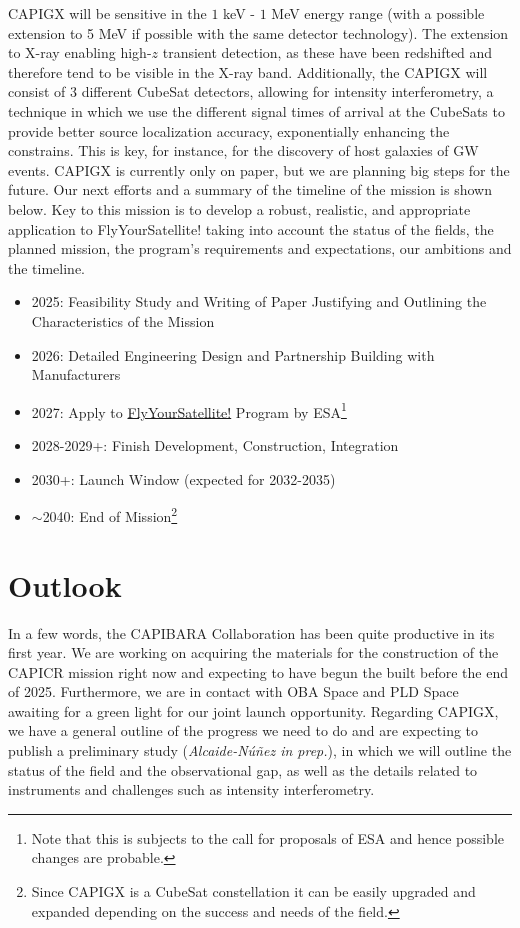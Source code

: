 \documentclass[arxiv,usenatbib]{iupartex}
\begin{document}
CAPIGX will be sensitive in the $1$ keV - $1$ MeV energy range (with a possible extension to 5 MeV if possible with the same detector technology). The extension to X-ray enabling high-$z$ transient detection, as these have been redshifted and therefore tend to be visible in the X-ray band. Additionally, the CAPIGX will consist of 3 different CubeSat detectors, allowing for intensity interferometry, a technique in which we use the different signal times of arrival at the CubeSats to provide better source localization accuracy, exponentially enhancing the constrains. This is key, for instance, for the discovery of host galaxies of GW events. CAPIGX is currently only on paper, but we are planning big steps for the future. Our next efforts and a summary of the timeline of the mission is shown below. Key to this mission is to develop a robust, realistic, and appropriate application to FlyYourSatellite! taking into account the status of the fields, the planned mission, the program's requirements and expectations, our ambitions and the timeline.
\begin{itemize}
    \item 2025: Feasibility Study and Writing of Paper Justifying and Outlining the Characteristics of the Mission
    \item 2026: Detailed Engineering Design and Partnership Building with Manufacturers
    \item 2027: Apply to \href{https://www.esa.int/Education/CubeSats_-_Fly_Your_Satellite}{FlyYourSatellite!} Program by ESA\footnote{Note that this is subjects to the call for proposals of ESA and hence possible changes are probable.}
    \item 2028-2029+: Finish Development, Construction, Integration
    \item 2030+: Launch Window (expected for 2032-2035)
    \item $\sim$2040: End of Mission\footnote{Since CAPIGX is a CubeSat constellation it can be easily upgraded and expanded depending on the success and needs of the field.}
\end{itemize}


\section{Outlook}
In a few words, the CAPIBARA Collaboration has been quite productive in its first year. We are working on acquiring the materials for the construction of the CAPICR mission right now and expecting to have begun the built before the end of 2025. Furthermore, we are in contact with OBA Space and PLD Space awaiting for a green light for our joint launch opportunity. Regarding CAPIGX, we have a general outline of the progress we need to do and are expecting to publish a preliminary study (\textit{Alcaide-Núñez in prep.}), in which we will outline the status of the field and the observational gap, as well as the details related to instruments and challenges such as intensity interferometry.
\end{document}

